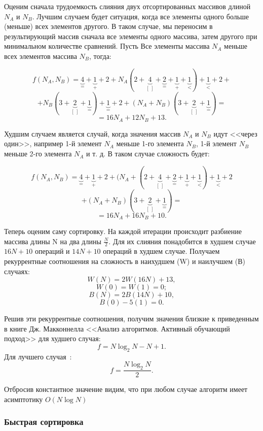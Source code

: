 \documentclass[a4paper,12pt]{article}
\begin{document}
		Оценим сначала трудоемкость слияния двух отсортированных массивов длиной $N_A$ и $N_B$. Лучшим случаем будет ситуация, когда все элементы одного больше (меньше) всех элементов другого. В таком случае, мы переносим в результирующий массив сначала все элементы одного массива, затем другого при минимальном количестве сравнений. Пусть Все элементы массива $N_A$ меньше всех элементов массива $N_B$, тогда:

		\[
			f(N_A, N_B) = \underbrace{4}_{=} + \underbrace{1}_{+} + 2 + N_A(2 + \underbrace{4}_{[\:]} + \underbrace{2}_{=} + \underbrace{1}_{+} + \underbrace{1}_{<}) + \underbrace{1}_{<} + 2 + \]
			\[   + N_B(3 + \underbrace{2}_{[\:]} + \underbrace{1}_{=})+ \underbrace{1}_{=} + 2 + (N_A + N_B)(3 + \underbrace{2}_{[\:]} + \underbrace{1}_{=})	=\]	
			\[   = 16N_A + 12N_B + 13. \]	
		
		
		Худшим случаем является случай, когда значения массив $N_A$ и $N_B$ идут <<через один>>, например 1-й элемент $N_A$ меньше 1-го элемента $N_B$, 1-й элемент $N_B$ меньше 2-го элемента $N_A$ и т. д. В таком случае сложность будет:
		
				\[
			f(N_A, N_B) = \underbrace{4}_{=} + \underbrace{1}_{+} + 2 + (N_A + (2 + \underbrace{4}_{[\:]} + \underbrace{2}_{=} + \underbrace{1}_{+} + \underbrace{1}_{<}) + \underbrace{1}_{<} + 2 \]
			\[   + (N_A + N_B)(3 + \underbrace{2}_{[\:]} + \underbrace{1}_{=})	=\]	
			\[   = 16N_A + 16N_B + 10. \]
			
			
		Теперь оценим саму сортировку. На каждой итерации происходит разбиение массива длины N на два длины $\frac{N}{2}$. Для их слияния понадобится в худшем случае $16N + 10$ операций и $14N + 10$ операций в худшем случае. Получаем рекуррентные соотношения на сложность в наихудшем (W) и наилучшем (В)
случаях:
\[
W(N) = 2W(16N) + 13,
\]
\[
W(0) = W(1) = 0;
\]
\[
B(N) = 2B(14N) + 10,
\]
\[
B(0) -5(1) = 0.
\]

Решив эти рекуррентные соотношения, получим значения близкие к приведенным в книге Дж. Макконнелла <<Анализ алгоритмов. Активный обучающий подход>> для худшего случая:
		\[
		f = N \log_2 N - N + 1.
		\]
		Для лучшего случая~\cite{makkonell}:
		\[
		f = \frac{N \log_2 N}{2}.
		\]
		
		Отбросив константное значение видим, что при любом случае алгоритм имеет асимптотику $O(N\log N)$
		\subsubsection{Быстрая сортировка}
			
\end{document}

